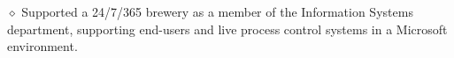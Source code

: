\bigskip

\medskip

\parindent=20pt
\item{$\diamond$} Supported a 24/7/365 brewery as a member of the
Information Systems department, supporting end-users and live process 
control systems in a Microsoft environment.
\parindent=0pt

\bigskip








